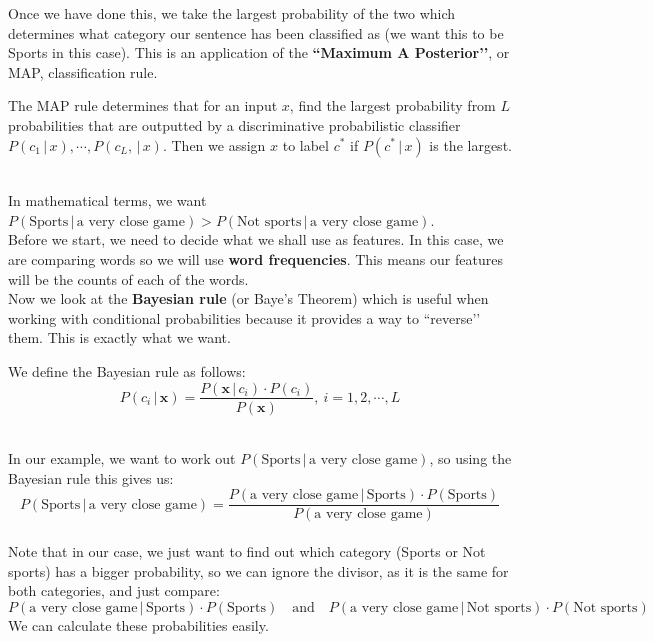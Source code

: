 \documentclass[11pt,fleqn]{book} %
\begin{document}
\noindent
Once we have done this, we take the largest probability of the two which determines what category our sentence has been classified as (we want this to be Sports in this case). This is an application of the \textbf{``Maximum A Posterior’’}, or MAP, classification rule. \\

\begin{definition}
	The MAP rule determines that for an input $x$, find the largest probability from $L$ probabilities that are outputted by a discriminative probabilistic classifier  $P(c_1 \, \vert \, x), \cdots, P(c_L, \, \vert \, x)$. Then we assign $x$ to label $c^*$ if $P(c^* \, \vert \, x)$ is the largest.
\end{definition}
\ \\
In mathematical terms, we want $P(\text{Sports}\, | \,\text{a very close game}) > P(\text{Not sports}\, |\, \text{a very close game})$. \\

\noindent
Before we start, we need to decide what we shall use as features. In this case, we are comparing words so we will use \textbf{word frequencies}. This means our features will be the counts of each of the words. \\

\noindent
Now we look at the \textbf{Bayesian rule} (or Baye’s Theorem) which is useful when working with conditional probabilities because it provides a way to ``reverse’’ them. This is exactly what we want. \\

\begin{definition}
	We define the Bayesian rule as follows:
	\begin{equation}
	P(c_i \, \vert \, \textbf{x}) = \frac{P(\textbf{x} \, \vert \, c_i) \cdot P(c_i)}{P(\textbf{x})},~i = 1,2,\cdots,L
	\end{equation}
\end{definition}
\ \\
\noindent
In our example, we want to work out $P(\text{Sports} \, \vert \, \text{a very close game})$, so using the Bayesian rule this gives us:
\begin{equation*}
P(\text{Sports} \, \vert \, \text{a very close game}) = \frac{P(\text{a very close game}\, \vert \, \text{Sports}) \cdot P(\text{Sports})} {P(\text{a very close game})}
\end{equation*}
\ \\
\noindent
Note that in our case, we just want to find out which category (Sports or Not sports) has a bigger probability, so we can ignore the divisor, as it is the same for both categories, and just compare:
\begin{equation*}
P(\text{a very close game}\, |\, \text{Sports}) \cdot P(\text{Sports}) \quad \text{and} \quad
P(\text{a very close game}\, |\, \text{Not sports}) \cdot P(\text{Not sports})
\end{equation*}
\noindent
We can calculate these probabilities easily. \\
\end{document}
